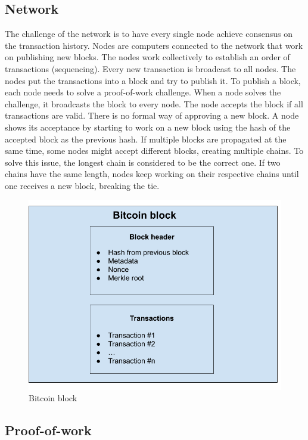 \subsection{Network}
The challenge of the network is to have every single node achieve consensus on the transaction history. Nodes are computers connected to the network
that work on publishing new blocks. The nodes work collectively to establish an order of transactions (sequencing). Every new transaction is broadcast to all nodes.
The nodes put the transactions into a block and try to publish it. To publish a block, each node needs to solve a proof-of-work challenge.
When a node solves the challenge, it broadcasts the block to every node. The node accepts the block if all transactions are valid. There is no formal
way of approving a new block. A node shows its acceptance by starting to work on a new block using the hash of the accepted block as the previous hash.
If multiple blocks are propagated at the same time, some nodes might accept different blocks, creating multiple chains. To solve this issue, the longest chain is considered to be the correct one.
If two chains have the same length, nodes keep working on their respective chains until one receives a new block, breaking the tie. \cite{MB17}

\begin{figure}[H]
   \centering
   \includegraphics[width=130mm]{BitcoinBlock.png}
   \caption{Bitcoin block}
   \label{overflow}
   \end{figure}


\subsection{Proof-of-work}

